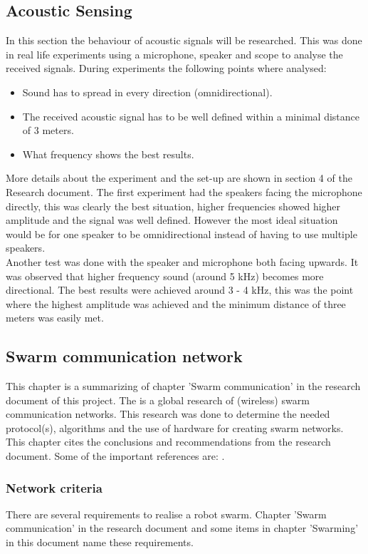 \documentclass[10pt,a4paper]{article}
\begin{document}
\subsection{Acoustic Sensing}
In this section the behaviour of acoustic signals will be researched. This was done in real life experiments using a microphone, speaker and scope to analyse the received signals. During experiments the following points where analysed:

\begin{itemize}
\item Sound has to spread in every direction (omnidirectional).
\item The received acoustic signal has to be well defined within a minimal distance of 3 meters.
\item What frequency shows the best results.
\end{itemize}

More details about the experiment and the set-up are shown in section 4 of the Research document. The first experiment had the speakers facing the microphone directly, this was clearly the best situation, higher frequencies showed higher amplitude and the signal was well defined. However the most ideal situation would be for one speaker to be omnidirectional instead of having to use multiple speakers.  \\
Another test was done with the speaker and microphone both facing upwards. It was observed that higher frequency sound (around 5 kHz) becomes more directional. The best results were achieved around 3 - 4 kHz, this was the point where the highest amplitude was achieved and the minimum distance of three meters was easily met.
\subsection{Swarm communication network}
This chapter is a summarizing of chapter 'Swarm communication' in the research document of this project. The is a global research of (wireless) swarm communication networks. This research was done to determine the needed protocol(s), algorithms and the use of hardware for creating swarm networks. This chapter cites the conclusions and recommendations from the research document. Some of the important references are: \cite{combook} \cite{multi-hopwirelessnetworks} \cite{meshnetworking} \cite{position-based}.

\subsubsection{Network criteria}
There are several requirements to realise a robot swarm. Chapter 'Swarm communication' in the research document and some items in chapter 'Swarming' in this document name these requirements. 
\end{document}
